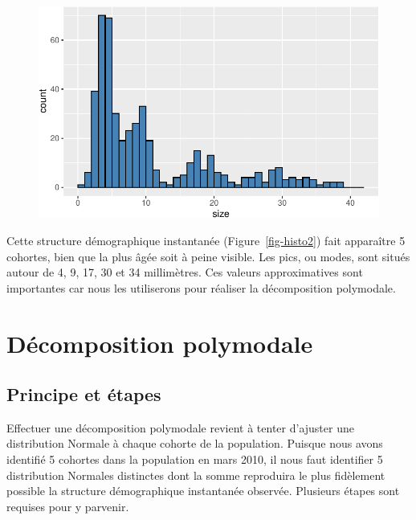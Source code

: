 \documentclass[
  a4paper,
  DIV=11,
  numbers=noendperiod,
  oneside]{scrreprt}
\begin{document}
\begin{figure}[H]


{\centering \includegraphics{04-Cohortes_files/figure-pdf/fig-histo2-1.pdf}

}

\end{figure}

Cette structure démographique instantanée (Figure~\ref{fig-histo2}) fait
apparaître 5 cohortes, bien que la plus âgée soit à peine visible. Les
pics, ou modes, sont situés autour de 4, 9, 17, 30 et 34 millimètres.
Ces valeurs approximatives sont importantes car nous les utiliserons
pour réaliser la décomposition polymodale.

\hypertarget{duxe9composition-polymodale}{%
\section{Décomposition polymodale}\label{duxe9composition-polymodale}}

\hypertarget{principe-et-uxe9tapes}{%
\subsection{Principe et étapes}\label{principe-et-uxe9tapes}}

Effectuer une décomposition polymodale revient à tenter d'ajuster une
distribution Normale à chaque cohorte de la population. Puisque nous
avons identifié 5 cohortes dans la population en mars 2010, il nous faut
identifier 5 distribution Normales distinctes dont la somme reproduira
le plus fidèlement possible la structure démographique instantanée
observée. Plusieurs étapes sont requises pour y parvenir.
\end{document}
